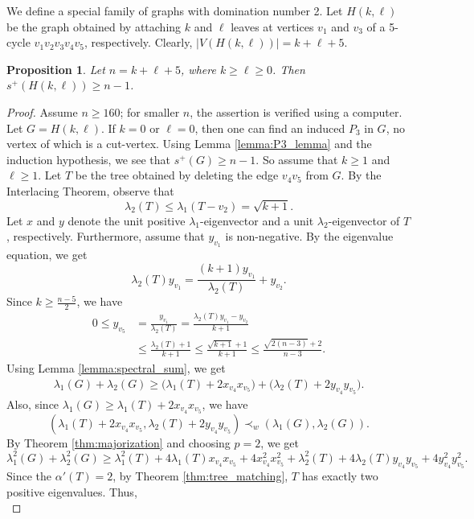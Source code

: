 \documentclass{article}
\newtheorem{proposition}{Proposition}[section]
\begin{document}
We define a special family of graphs with domination number 2. Let $H(k, \ell)$ be the graph obtained by attaching $k$ and $\ell$ leaves at vertices $v_1$ and $v_3$ of a 5-cycle $v_1v_2v_3v_4v_5$, respectively. Clearly, $|V(H(k,\ell))|=k+\ell+5$. 

\begin{proposition}\label{prop:pentagon} Let $n=k+\ell+5$, where $k\ge \ell\ge 0$. Then $s^+(H(k,\ell))\ge n-1$. 
\end{proposition}

\begin{proof}
Assume $n\ge 160$; for smaller $n$, the assertion is verified using a computer. Let $G=H(k,\ell)$. If $k=0$ or $\ell=0$, then one can find an induced $P_3$ in $G$, no vertex of which is a cut-vertex. Using Lemma \ref{lemma:P3_lemma} and the induction hypothesis, we see that $s^+(G)\ge n-1$. So assume that $k\ge 1$ and $\ell\ge 1$. Let $T$ be the tree obtained by deleting the edge $v_4v_5$ from $G$. By the Interlacing Theorem, observe that
\[ \lambda_2(T)\le \lambda_1(T - v_2) = \sqrt{k+1}.\]
 Let $x$ and $y$ denote the unit positive $\lambda_1$-eigenvector and a unit $\lambda_2$-eigenvector of $T$, respectively. Furthermore, assume that $y_{v_1}$ is non-negative. By the eigenvalue equation, we get 
\[\lambda_2(T)y_{v_1} = \frac{(k+1)y_{v_1}}{\lambda_2(T)} + y_{v_2}.\]
Since $k\ge \frac{n-5}{2}$, we have
\begin{align*}
  0\le y_{v_5}&=\frac{y_{v_1}}{\lambda_2(T)} = \frac{\lambda_2(T) y_{v_1} - y_{v_2}}{k+1} \\
  & \le \frac{\lambda_2(T)+1}{k+1} \le  \frac{\sqrt{k+1} + 1}{k+1} \le \frac{\sqrt{2(n-3)}+2}{n-3}. 
\end{align*}
Using Lemma \ref{lemma:spectral_sum}, we get
\begin{align*}
    \lambda_1(G) + \lambda_2(G) \ge \Big(\lambda_1(T) +2x_{v_4}x_{v_5}\Big) + \Big(\lambda_2(T) +2y_{v_4}y_{v_5}\Big).
\end{align*}
Also, since $\lambda_1(G) \ge \lambda_1(T) +2x_{v_4}x_{v_5}$, we have 
\[(\lambda_1(T) +2x_{v_4}x_{v_5}, \lambda_2(T) +2y_{v_4}y_{v_5}) \prec_w (\lambda_1(G),\lambda_2(G)).\] 
By Theorem \ref{thm:majorization} and choosing $p=2$, we get 
\[
    \lambda^2_1(G) + \lambda^2_2(G) \ge \lambda^2_1(T) +4\lambda_1(T)x_{v_4}x_{v_5}+ 4x^2_{v_4}x^2_{v_5} + \lambda^2_2(T) +4\lambda_2(T)y_{v_4}y_{v_5}+ 4y^2_{v_4}y^2_{v_5}.
\]
Since the $\alpha'(T)=2$, by Theorem \ref{thm:tree_matching}, $T$ has exactly two positive eigenvalues. Thus, 
\begin{equation}

\end{equation}
\end{proof}
\end{document}
